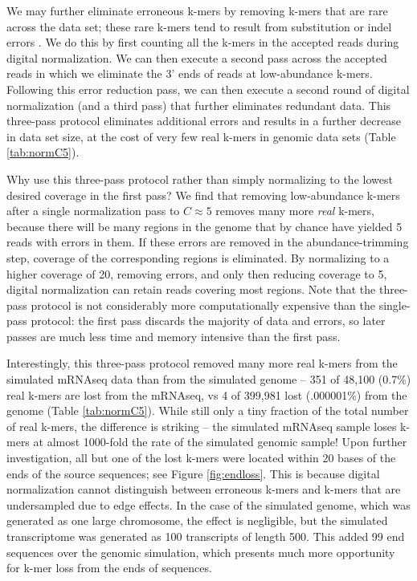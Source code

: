 \documentclass{pnastwo}
\begin{document}
\begin{article}
We may further eliminate erroneous k-mers by removing k-mers that are
rare across the data set; these rare k-mers tend to result from
substitution or indel errors \cite{pubmed21114842}.  We do this by
first counting all the k-mers in the accepted reads during digital
normalization.  We can then execute a second pass across the accepted
reads in which we eliminate the 3' ends of reads at low-abundance
k-mers.  Following this error reduction pass, we can then execute a
second round of digital normalization (and a third pass) that further eliminates
redundant data.  This three-pass protocol eliminates additional
errors and results in a further decrease in data set size, at the cost
of very few real k-mers in genomic data sets (Table \ref{tab:normC5}).

Why use this three-pass protocol rather than simply normalizing to the
lowest desired coverage in the first pass?  We find that removing
low-abundance k-mers after a single normalization pass to $C \approx
5$ removes many more {\em real} k-mers, because there will be many
regions in the genome that by chance have yielded 5 reads with errors
in them. If these errors are removed in the abundance-trimming step,
coverage of the corresponding regions is eliminated.  By normalizing
to a higher coverage of 20, removing errors, and only then reducing
coverage to 5, digital normalization can retain reads covering most
regions.  Note that the three-pass protocol is not considerably more
computationally expensive than the single-pass protocol: the first
pass discards the majority of data and errors, so later passes are
much less time and memory intensive than the first pass.

Interestingly, this three-pass protocol removed many more real k-mers
from the simulated mRNAseq data than from the simulated genome -- 351
of 48,100 (0.7\%) real k-mers are lost from the mRNAseq, vs 4 of
399,981 lost (.000001\%) from the genome (Table \ref{tab:normC5}).
While still only a tiny fraction of the total number of real k-mers,
the difference is striking -- the simulated mRNAseq sample loses k-mers
at almost 1000-fold the rate of the simulated genomic sample!  Upon
further investigation, all but one of the lost k-mers were located
within 20 bases of the ends of the source sequences; see Figure
\ref{fig:endloss}.  This is because digital normalization cannot
distinguish between erroneous k-mers and k-mers that are undersampled
due to edge effects.  In the case of the simulated genome, which was
generated as one large chromosome, the effect is negligible, but the
simulated transcriptome was generated as 100 transcripts of length
500.  This added 99 end sequences over the genomic simulation, which
presents much more opportunity for k-mer loss from the ends of
sequences.


\end{article}
\end{document}
